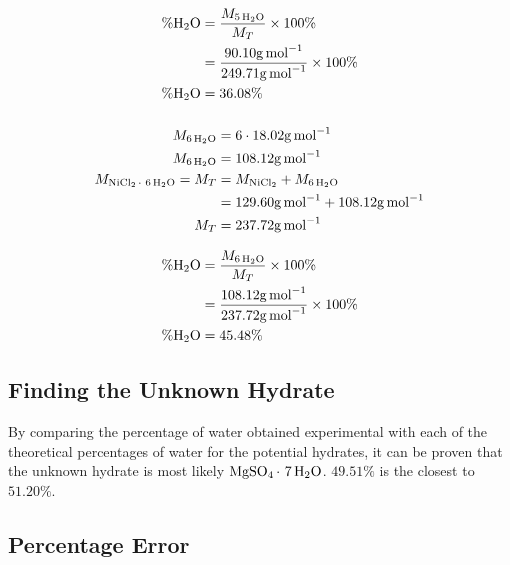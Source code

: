 \documentclass{article}
\begin{document}
\begin{align*}
    \%\ce{H2O} & = \frac{M_{\ce{5H2O}}}{M_T} \times 100\%                                \\
               & = \frac{90.10\si{\gram\per\mol}}{249.71\si{\gram\per\mol}} \times 100\% \\
    \%\ce{H2O} & = 36.08\%
\end{align*}

\subsubsection{}

\begin{align*}
    M_{\ce{6H2O}}              & = 6 \cdot 18.02\si{\gram\per\mol}                     \\
    M_{\ce{6H2O}}              & = 108.12\si{\gram\per\mol}                            \\
    M_{\ce{NiCl2* 6H2O}} = M_T & = M_{\ce{NiCl2}} + M_{\ce{6H2O}}                      \\
                               & = 129.60\si{\gram\per\mol} + 108.12\si{\gram\per\mol} \\
    M_T                        & = 237.72\si{\gram\per\mol}
\end{align*}

\begin{align*}
    \%\ce{H2O} & = \frac{M_{\ce{6H2O}}}{M_T} \times 100\%                                 \\
               & = \frac{108.12\si{\gram\per\mol}}{237.72\si{\gram\per\mol}} \times 100\% \\
    \%\ce{H2O} & = 45.48\%
\end{align*}

\subsection{Finding the Unknown Hydrate}

By comparing the percentage of water obtained experimental with each of the theoretical percentages of water for the potential hydrates, it can be proven that the unknown hydrate is most likely $\ce{MgSO4* 7H2O}$.
$49.51\%$ is the closest to $51.20\%$.

\subsection{Percentage Error}
\end{document}
